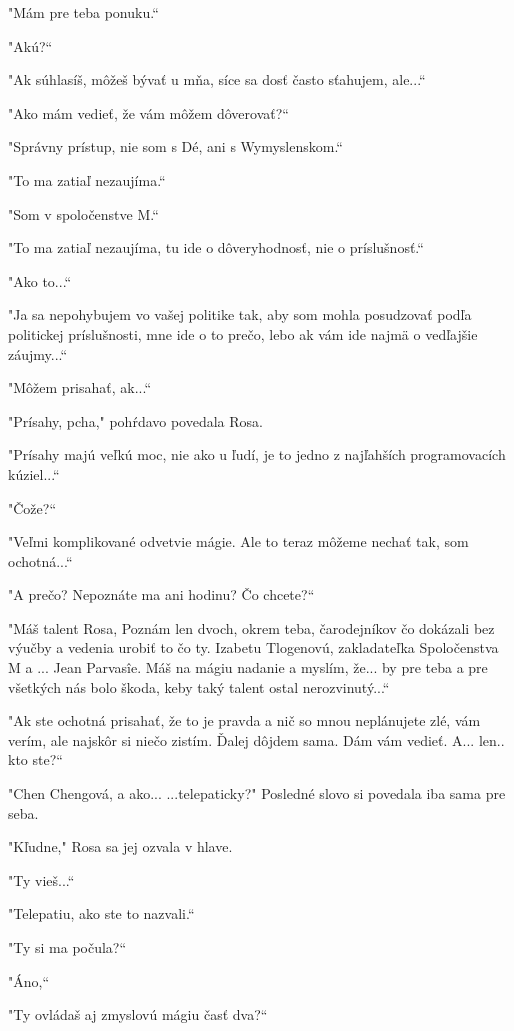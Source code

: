 \documentclass{book}
\begin{document}
"$ $Mám pre teba ponuku.“

"$ $Akú?“

"$ $Ak súhlasíš, môžeš bývať u mňa, síce sa dosť často sťahujem, ale...“

"$ $Ako mám vedieť, že vám môžem dôverovať?“

"$ $Správny prístup, nie som s Dé, ani s Wymyslenskom.“

"$ $To ma zatiaľ nezaujíma.“

"$ $Som v spoločenstve M.“

"$ $To ma zatiaľ nezaujíma, tu ide o dôveryhodnosť, nie o príslušnosť.“

"$ $Ako to...“

"$ $Ja sa nepohybujem vo vašej politike tak, aby som mohla posudzovať podľa politickej príslušnosti, mne ide o to prečo, lebo ak vám ide najmä o vedľajšie záujmy...“

"$ $Môžem prisahať, ak...“

"$ $Prísahy, pcha,"$ $ pohŕdavo povedala Rosa.

"$ $Prísahy majú veľkú moc, nie ako u ľudí, je to jedno z najľahších programovacích kúziel...“

"$ $Čože?“

"$ $Veľmi komplikované odvetvie mágie. Ale to teraz môžeme nechať tak, som ochotná...“

"$ $A prečo? Nepoznáte ma ani hodinu? Čo chcete?“

"$ $Máš talent Rosa, Poznám len dvoch, okrem teba, čarodejníkov čo dokázali bez výučby a vedenia urobiť to čo ty. Izabetu Tlogenovú, zakladateľka Spoločenstva M a ... Jean Parvasîe. Máš na mágiu nadanie a myslím, že... by pre teba a pre všetkých nás bolo škoda, keby taký talent ostal nerozvinutý...“

"$ $Ak ste ochotná prisahať, že to je pravda a nič so mnou neplánujete zlé, vám verím, ale najskôr si niečo zistím. Ďalej dôjdem sama. Dám vám vedieť. A... len.. kto ste?“

"$ $Chen Chengová, a ako... ...telepaticky?"$ $ Posledné slovo si povedala iba sama pre seba.

"$ $Kľudne,"$ $ Rosa sa jej ozvala v hlave.

"$ $Ty vieš...“

"$ $Telepatiu, ako ste to nazvali.“

"$ $Ty si ma počula?“

"$ $Áno,“

"$ $Ty ovládaš aj zmyslovú mágiu časť dva?“
\end{document}

